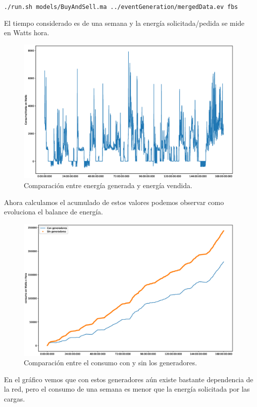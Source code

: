 {\tt ./run.sh models/BuyAndSell.ma ../eventGeneration/mergedData.ev fbs}

El tiempo considerado es de una semana y la energía solicitada/pedida se mide en Watts hora.
 
\begin{figure}[H]
    \centering
    \includegraphics[scale=0.3]{images/cons.eps}
    \caption{Comparación entre energía generada y energía vendida.}
\end{figure}

Ahora calculamos el acumulado de estos valores podemos observar como evoluciona el
balance de energía. 

\begin{figure}[H]
    \centering
    \includegraphics[scale=0.3]{images/compWW.eps}
    \caption{Comparación entre el consumo con y sin los generadores.}
\end{figure}

En el gráfico vemos que con estos generadores aún existe bastante dependencia de la red,
pero el consumo de una semana es menor que la energía solicitada por las cargas.